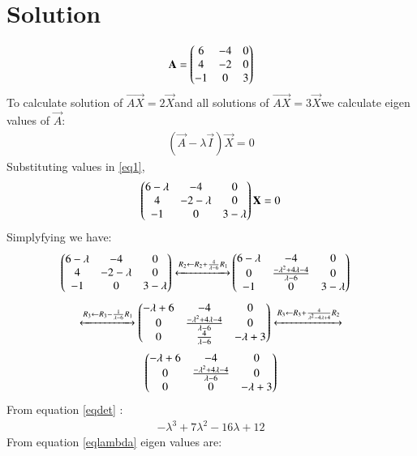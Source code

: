 \documentclass[journal,12pt,twocolumn]{IEEEtran}
\begin{document}
\section{Solution}
\begin{flushleft}
\begin{align}
\mathbf{A}=
\begin{pmatrix}6 & -4 & 0\\
4& -2 & 0\\
-1 &0 &3\end{pmatrix}
\end{align}
To calculate solution of  $\vec{AX}=2\vec{X}$and all solutions of $\vec{AX}=3\vec{X}$we calculate eigen values of $\vec{A}$:
\begin{align}\label{eq1}
(\vec{A}-\lambda\vec{I})\vec{X}=0
\end{align}
Substituting values in \eqref{eq1},
\begin{align}
\begin{pmatrix}6-\lambda& -4 & 0\\
4 & -2-\lambda & 0\\
-1 &0 &3-\lambda\end{pmatrix}
\mathbf{X}=0
\end{align}
Simplyfying we have:
\begin{align}\label{eqdet}
\begin{pmatrix}6-\lambda& -4 & 0\\
4 & -2-\lambda & 0\\
-1 &0 &3-\lambda\end{pmatrix}
\xleftrightarrow[]{R_2 \leftarrow R_2+\frac{4}{\lambda-6} R_1} 
&
\begin{pmatrix}6-\lambda&-4&0\\
0&\frac{-\lambda^2+4\lambda-4}{\lambda-6}&0\\
-1&0&3-\lambda\end{pmatrix} \nonumber 
\end{align}
\begin{align}
\xleftrightarrow[]{R_3 \leftarrow R_3-\frac{1}{\lambda-6}R_1}
    \begin{pmatrix}-\lambda+6&-4&0\\
            0&\frac{-\lambda^2+4\lambda-4}{\lambda-6}&0\\
            0&\frac{4}{\lambda-6}&-\lambda+3\end{pmatrix}
    \xleftrightarrow[]{R_3 \leftarrow R_3+\frac{4}{\lambda^2-4\lambda+4}R_2}\nonumber
\end{align}
\begin{align}
    \begin{pmatrix}-\lambda+6&-4&0\\
    0&\frac{-\lambda^2+4\lambda-4}{\lambda-6}&0\\
    0&0&-\lambda+3\end{pmatrix}
\end{align}
From equation \eqref{eqdet} :
\begin{align}\label{eqlambda}
-\lambda^3+7\lambda^2-16\lambda+12
\end{align}
From equation \eqref{eqlambda} eigen values are:
\begin{align}

\end{align}
\end{flushleft}
\end{document}
